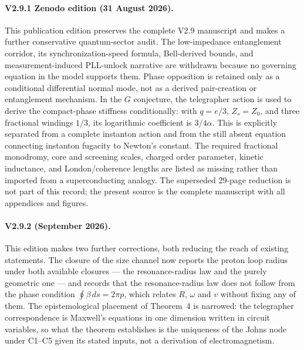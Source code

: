 \documentclass[11pt,a4paper]{article}
\theoremstyle{plain}
\theoremstyle{remark}
\begin{document}
\paragraph{V2.9.1 Zenodo edition (31 August 2026).} This publication edition preserves the complete V2.9 manuscript and makes a further conservative quantum-sector audit. The low-impedance entanglement corridor, its synchronization-speed formula, Bell-derived bounds, and measurement-induced PLL-unlock narrative are withdrawn because no governing equation in the model supports them. Phase opposition is retained only as a conditional differential normal mode, not as a derived pair-creation or entanglement mechanism. In the $G$ conjecture, the telegrapher action is used to derive the compact-phase stiffness conditionally: with $q=e/3$, $Z_s=Z_0$, and three fractional windings $1/3$, its logarithmic coefficient is $3/4\alpha$. This is explicitly separated from a complete instanton action and from the still absent equation connecting instanton fugacity to Newton's constant. The required fractional monodromy, core and screening scales, charged order parameter, kinetic inductance, and London/coherence lengths are listed as missing rather than imported from a superconducting analogy. The superseded 29-page reduction is not part of this record; the present source is the complete manuscript with all appendices and figures.

\paragraph{V2.9.2 (September 2026).} This edition makes two further corrections, both reducing the reach of existing statements. The closure of the size channel now reports the proton loop radius under both available closures --- the resonance-radius law and the purely geometric one --- and records that the resonance-radius law does not follow from the phase condition \mbox{$\oint\beta\,ds = 2\pi p$}, which relates $R$, $\omega$ and $v$ without fixing any of them. The epistemological placement of Theorem~4 is narrowed: the telegrapher correspondence is Maxwell's equations in one dimension written in circuit variables, so what the theorem establishes is the uniqueness of the Johns node under C1--C5 given its stated inputs, not a derivation of electromagnetism.

\end{document}
